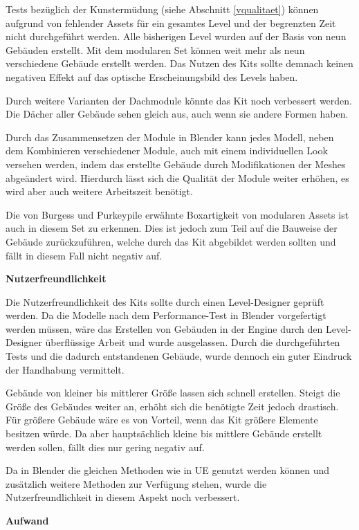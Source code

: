 \newpage
Tests bezüglich der Kunstermüdung (siehe Abschnitt \ref{vqualitaet}) können aufgrund von fehlender Assets für ein gesamtes Level und der begrenzten Zeit nicht durchgeführt werden. Alle bisherigen Level wurden auf der Basis von neun Gebäuden erstellt. Mit dem modularen Set können weit mehr als neun verschiedene Gebäude erstellt werden. Das Nutzen des Kits sollte demnach keinen negativen Effekt auf das optische Erscheinungsbild des Levels haben.
\par
Durch weitere Varianten der Dachmodule könnte das Kit noch verbessert werden. Die Dächer aller Gebäude sehen gleich aus, auch wenn sie andere Formen haben.
\par
Durch das Zusammensetzen der Module in Blender kann jedes Modell, neben dem Kombinieren verschiedener Module, auch mit einem individuellen Look versehen werden, indem das erstellte Gebäude durch Modifikationen der Meshes abgeändert wird. Hierdurch lässt sich die Qualität der Module weiter erhöhen, es wird aber auch weitere Arbeitszeit benötigt.	
\par
Die von Burgess und Purkeypile erwähnte Boxartigkeit von modularen Assets ist auch in diesem Set zu erkennen. Dies ist jedoch zum Teil auf die Bauweise der Gebäude zurückzuführen, welche durch das Kit abgebildet werden sollten und fällt in diesem Fall nicht negativ auf.
\par\textbf{Nutzerfreundlichkeit}\par
Die Nutzerfreundlichkeit des Kits sollte durch einen Level-Designer geprüft werden. Da die Modelle nach dem Performance-Test in Blender vorgefertigt werden müssen, wäre das Erstellen von Gebäuden in der Engine durch den Level-Designer überflüssige Arbeit und wurde ausgelassen. Durch die durchgeführten Tests und die dadurch entstandenen Gebäude, wurde dennoch ein guter Eindruck der Handhabung vermittelt.
\par
Gebäude von kleiner bis mittlerer Größe lassen sich schnell erstellen. Steigt die Größe des Gebäudes weiter an, erhöht sich die benötigte Zeit jedoch drastisch. Für größere Gebäude wäre es von Vorteil, wenn das Kit größere Elemente besitzen würde. Da aber hauptsächlich kleine bis mittlere Gebäude erstellt werden sollen, fällt dies nur gering negativ auf.
\par
Da in Blender die gleichen Methoden wie in UE genutzt werden können und zusätzlich weitere Methoden zur Verfügung stehen, wurde die Nutzerfreundlichkeit in diesem Aspekt noch verbessert.
\par\textbf{Aufwand}\par     
